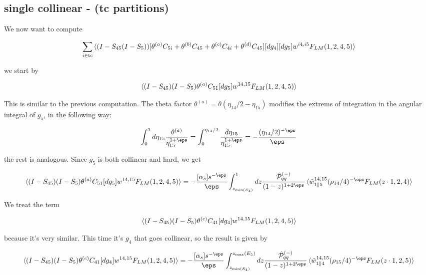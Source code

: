 \documentclass[11pt]{report}
\begin{document}
\subsection{single collinear - (tc partitions)}

We now want to compute 

\begin{align}
    \sum_{i \in \text{tc}} \braket{ (I-S_{45}(I-S_5))[\theta^{(a)}C_{5i} + \theta^{(b)}C_{45} + \theta^{(c)}C_{4i} + \theta^{(d)}C_{45}] [dg_4][dg_5] w^{i4, i5}F_{LM}(1, 2, 4, 5)}
\end{align}

we start by

\begin{align}
    \braket{(I-S_{45})(I-S_5)\theta^{(a)}C_{51}[dg_5]w^{14, 15}F_{LM}(1, 2, 4, 5)}
\end{align}

This is similar to the previous computation. The theta factor \(\theta^{(a)} = \theta(\eta_{14}/2-\eta_{15})\) modifies the extrems of integration in the angular integral of \(g_5\), in the following way: 

\begin{align}
    \int_0^1 d\eta_{15} \frac{\theta^{(a)}}{\eta_{15}^{1+\eps}} = \int_0^{\eta_{14}/2} \frac{d\eta_{15}}{\eta_{15}^{1+\eps}} = -\frac{(\eta_{14}/2)^{-\eps}}{\eps}
\end{align}

the rest is analogous. Since \(g_5\) is both collinear and hard, we get

\begin{align}
    \braket{(I-S_{45})(I-S_5)\theta^{(a)}C_{51}[dg_5]w^{14, 15}F_{LM}(1, 2, 4, 5)} = -\frac{[\alpha_s]s^{-\eps}}{\eps} \int_{z_{\min(E_4)}}^1 dz \frac{\hat{\mathcal{P}}_{qq}^{(-)}}{(1-z)^{1+2\eps}}\braket{\tilde{w}^{14, 15}_{1 \parallel 5} (\rho_{14}/4)^{-\eps}F_{LM}(z\cdot 1, 2, 4)}
\end{align}

We treat the term 

\begin{align}
    \braket{(I-S_{45})(I-S_5)\theta^{(c)}C_{41}[dg_4]w^{14, 15}F_{LM}(1, 2, 4, 5)}
\end{align}

because it's very similar. This time it's \(g_4\) that goes collinear, so the result is given by 

\begin{align}
    \braket{(I-S_{45})(I-S_5)\theta^{(c)}C_{41}[dg_4]w^{14, 15}F_{LM}(1, 2, 4, 5)}  = -\frac{[\alpha_s]s^{-\eps}}{\eps} \int_{z_{\min(E_4)}}^{z_{\max}(E_5)} dz \frac{\hat{\mathcal{P}}_{qq}^{(-)}}{(1-z)^{1+2\eps}}\braket{\tilde{w}^{14, 15}_{1 \parallel 4} (\rho_{15}/4)^{-\eps}F_{LM}(z\cdot 1, 2, 5)}
\end{align}
\end{document}

